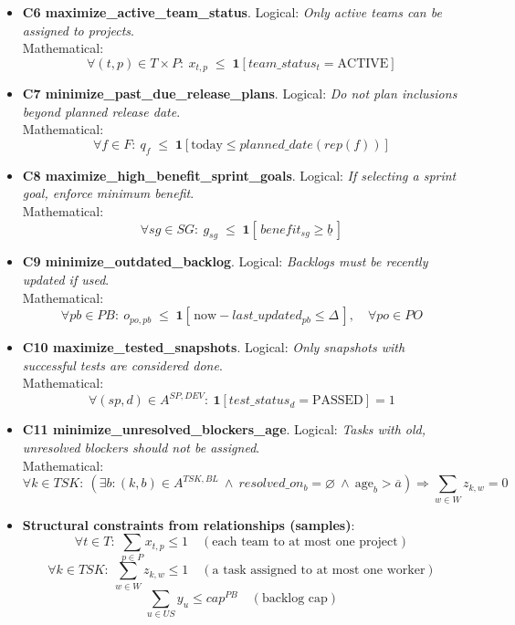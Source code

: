 \documentclass[11pt]{article}
\begin{document}
\begin{itemize}[leftmargin=2em]
  \item \textbf{C6 maximize\_active\_team\_status}. Logical: \emph{Only active teams can be assigned to projects}. \\
  Mathematical:
  \[
    \forall (t,p)\in T\times P:\ x_{t,p} \;\le\; \mathbf{1}[team\_status_t=\text{ACTIVE}]
  \]

  \item \textbf{C7 minimize\_past\_due\_release\_plans}. Logical: \emph{Do not plan inclusions beyond planned release date}. \\
  Mathematical:
  \[
    \forall f\in F:\ q_f \;\le\; \mathbf{1}[\text{today}\le planned\_date(rep(f))]
  \]

  \item \textbf{C8 maximize\_high\_benefit\_sprint\_goals}. Logical: \emph{If selecting a sprint goal, enforce minimum benefit}. \\
  Mathematical:
  \[
    \forall sg\in SG:\ g_{sg} \;\le\; \mathbf{1}[\,benefit_{sg}\ge \underline{b}\,]
  \]

  \item \textbf{C9 minimize\_outdated\_backlog}. Logical: \emph{Backlogs must be recently updated if used}. \\
  Mathematical:
  \[
    \forall pb\in PB:\ o_{po,pb} \;\le\; \mathbf{1}[\,\text{now}-last\_updated_{pb}\le \Delta\,],\quad \forall po\in PO
  \]

  \item \textbf{C10 maximize\_tested\_snapshots}. Logical: \emph{Only snapshots with successful tests are considered done}. \\
  Mathematical:
  \[
    \forall (sp,d)\in A^{SP,DEV}:\ \mathbf{1}[test\_status_d=\text{PASSED}] = 1
  \]

  \item \textbf{C11 minimize\_unresolved\_blockers\_age}. Logical: \emph{Tasks with old, unresolved blockers should not be assigned}. \\
  Mathematical:
  \[
    \forall k\in TSK:\ \left(\exists b:(k,b)\in A^{TSK,BL}\ \wedge\ resolved\_on_b=\varnothing\ \wedge\ \text{age}_b>\overline{a}\right) \Rightarrow \sum_{w\in W} z_{k,w}=0
  \]

  \item \textbf{Structural constraints from relationships (samples)}:
  \[
    \forall t\in T:\ \sum_{p\in P} x_{t,p} \le 1 \quad (\text{each team to at most one project})
  \]
  \[
    \forall k\in TSK:\ \sum_{w\in W} z_{k,w} \le 1 \quad (\text{a task assigned to at most one worker})
  \]
  \[
    \sum_{u\in US} y_u \le cap^{PB} \quad (\text{backlog cap})
  \]

\end{itemize}
\end{document}
